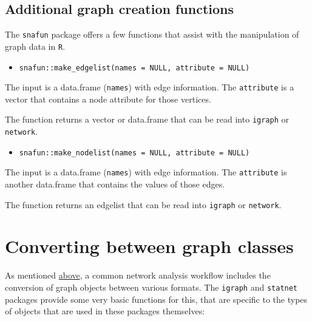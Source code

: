 \documentclass[
]{article}
\providecommand{\tightlist}{%
  \setlength{\itemsep}{0pt}\setlength{\parskip}{0pt}}
\begin{document}
\hypertarget{additional-graph-creation-functions}{%
\subsection{Additional graph creation
functions}\label{additional-graph-creation-functions}}

The \texttt{snafun} package offers a few functions that assist with the
manipulation of graph data in \texttt{R}.

\begin{itemize}
\tightlist
\item
  \texttt{snafun::make\_edgelist(names\ =\ NULL,\ attribute\ =\ NULL)}
\end{itemize}

The input is a data.frame (\texttt{names}) with edge information. The
\texttt{attribute} is a vector that contains a node attribute for those
vertices.

The function returns a vector or data.frame that can be read into
\texttt{igraph} or \texttt{network}.

\begin{itemize}
\tightlist
\item
  \texttt{snafun::make\_nodelist(names\ =\ NULL,\ attribute\ =\ NULL)}
\end{itemize}

The input is a data.frame (\texttt{names}) with edge information. The
\texttt{attribute} is another data.frame that contains the values of
those edges.

The function returns an edgelist that can be read into \texttt{igraph}
or \texttt{network}.

\hypertarget{converting-between-graph-classes}{%
\section{Converting between graph
classes}\label{converting-between-graph-classes}}

As mentioned \protect\hyperlink{snafun-intro}{above}, a common network
analysis workflow includes the conversion of graph objects between
various formats. The \texttt{igraph} and \texttt{statnet} packages
provide some very basic functions for this, that are specific to the
types of objects that are used in these packages themselves:
\end{document}
